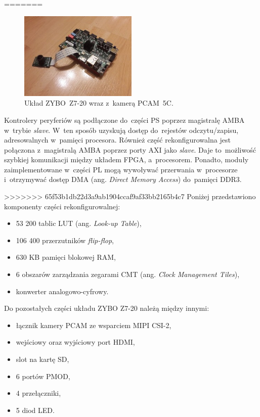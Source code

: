 =======
\begin{figure}[h]
	\centering
	\includegraphics[width=0.5\textwidth]{plytka_kamera.jpg}
	\caption{Układ ZYBO~Z7-20 wraz z~kamerą PCAM~5C.}
	\label{fig:plytka_kamera}
\end{figure}
Kontrolery peryferiów są podłączone do~części PS poprzez magistralę AMBA w~trybie \textit{slave}. W~ten sposób uzyskują dostęp do~rejestów odczytu/zapisu, adresowalnych w~pamięci procesora. Również część rekonfigurowalna jest połączona z~magistralą AMBA poprzez porty AXI jako \textit{slave}. Daje to~możliwość szybkiej komunikacji między układem FPGA, a~procesorem. Ponadto, moduły zaimplementowane w~części PL mogą wywoływać przerwania w~procesorze i~otrzymywać dostęp DMA (ang. \textit{Direct Memory Access}) do~pamięci DDR3.\par
>>>>>>> 65f53b1db22d3a9ab1904ccaf9af33bb2165b4c7
Poniżej przedstawiono komponenty części rekonfigurowalnej:
\begin{itemize}
	\item 53 200 tablic LUT (ang. \textit{Look-up Table}),
	\item 106 400 przerzutników \textit{flip-flop},
	\item 630 KB pamięci blokowej RAM,
	\item 6 obszarów zarządzania zegarami CMT (ang. \textit{Clock Management Tiles}),
	\item konwerter analogowo-cyfrowy.
\end{itemize}
Do pozostałych części układu ZYBO Z7-20 należą między innymi:
\begin{itemize}
	\item łącznik kamery PCAM ze wsparciem MIPI CSI-2,
	\item wejściowy oraz wyjściowy port HDMI,
	\item slot na kartę SD,
	\item 6 portów PMOD,
	\item 4 przełączniki,
	\item 5 diod LED.
\end{itemize}

